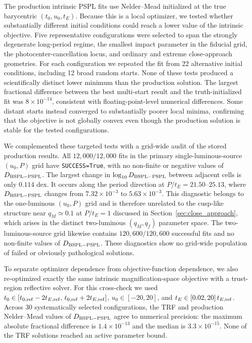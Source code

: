 \documentclass{article}
\begin{document}
The production intrinsic PSPL fits use Nelder--Mead initialized at the
true barycentric $(t_0,u_0,t_E)$. Because this is a local optimizer, we
tested whether substantially different initial conditions could reach a
lower value of the intrinsic objective. Five representative
configurations were selected to span the strongly degenerate
long-period regime, the smallest impact parameter in the fiducial grid,
the photocenter-cancellation locus, and ordinary and extreme
close-approach geometries. For each configuration we repeated the fit
from 22 alternative initial conditions, including 12 broad random
starts. None of these tests produced a scientifically distinct lower
minimum than the production solution. The largest fractional difference
between the best multi-start result and the truth-initialized fit was
$8\times10^{-14}$, consistent with floating-point-level numerical
differences. Some distant starts instead converged to substantially
poorer local minima, confirming that the objective is not globally
convex even though the production solution is stable for the tested
configurations.

We complemented these targeted tests with a grid-wide audit of the
stored production results. All $12{,}000/12{,}000$ fits in the primary
single-luminous-source $(u_0,P)$ grid have \texttt{SUCCESS=True}, with
no non-finite or negative values of $D_{\rm BSPL-PSPL}$. The largest
change in $\log_{10}D_{\rm BSPL-PSPL}$ between adjacent cells is only
$0.114$ dex. It occurs along the period direction at
$P/t_E=21.50$--$25.13$, where $D_{\rm BSPL-PSPL}$ changes from
$7.32\times10^{-3}$ to $5.63\times10^{-3}$. This diagnostic belongs
to the one-luminous $(u_0,P)$ grid and is therefore unrelated to the
cusp-like structure near $q_M\simeq0.1$ at $P/t_E=1$ discussed in
Section~\ref{sec:close_approach}, which arises in the distinct
two-luminous $(q_M,q_f)$ parameter space. The two-luminous-source grid
likewise contains $120{,}600/120{,}600$ successful fits and no
non-finite values of $D_{\rm BSPL-PSPL}$. These diagnostics show no
grid-wide population of failed or obviously pathological solutions.

To separate optimizer dependence from objective-function dependence, we
also re-optimized exactly the same intrinsic magnification-space
objective with a trust-region reflective solver. For this cross-check we
used $t_0\in[t_{0,\rm ref}-2t_{E,\rm ref},\,
 t_{0,\rm ref}+2t_{E,\rm ref}]$, $u_0\in[-20,20]$, and
$t_E\in[0.02,20]\,t_{E,\rm ref}$. Across 30 systematically selected
configurations, the TRF and production Nelder--Mead values of
$D_{\rm BSPL-PSPL}$ agree to numerical precision: the maximum absolute
fractional difference is $1.4\times10^{-13}$ and the median is
$3.3\times10^{-15}$. None of the TRF solutions reached an active
parameter bound.
\end{document}
